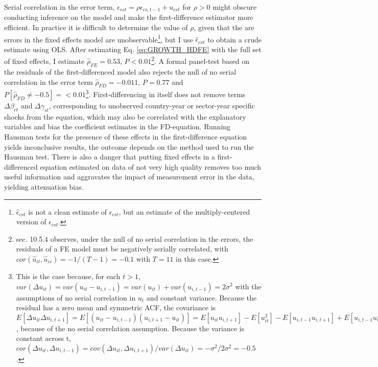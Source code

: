 \documentclass[a4paper]{article}
\begin{document}
Serial correlation in the error term, $\epsilon_{cst} = \rho \epsilon_{cs,t-1} + u_{cst}$ for $\rho > 0$ might obscure conducting inference on the model and make the first-difference estimator more efficient. In practice it is difficult to determine the value of $\rho$, given that the are errors in the fixed effects model are unobservable\footnote{$\hat{\epsilon}_{cst}$ is not a clean estimate of $\epsilon_{cst}$, but an estimate of the multiply-centered version of $\epsilon_{cst}$.}, but I use $\hat{\epsilon}_{cst}$ to obtain a crude estimate using OLS. After estimating Eq. \ref{eq:GROWTH_HDFE} with the full set of fixed effects, I estimate $\hat{\rho}_{FE} = 0.53$, $P<0.01$\footnote{\citet{wooldridge2010econometric} sec. 10.5.4 observes, under the null of no serial correlation in the errors, the residuals of a FE model must be negatively serially correlated, with $cor(\hat{u}_{it}, \hat{u}_{is})=-1/(T-1) = -0.1$ with $T = 11$ in this case.}. A formal panel-test based on the residuals of the first-differenced model also rejects the null of no serial correlation in the error term $\hat{\rho}_{FD} = -0.011$, $P=0.77$ and $P[\hat{\rho}_{FD} \neq -0.5]=<0.01$\footnote{This is the case because, for each $t > 1$, $var(\Delta u_{it}) = var(u_{it} - u_{i,t-1}) = var(u_{it}) + var(u_{i,t-1}) = 2\sigma^2$ with the assumptions of no serial correlation in $u_t$ and constant variance. Because the residual has a zero mean and symmetric ACF, the covariance is $E[\Delta u_{it}\Delta u_{i,t+1}] = E[(u_{it} - u_{i,t-1})(u_{i,t+1} - u_{it})] = E[u_{it} u_{i,t+1}] - E[u_{it}^2] - E[u_{i,t-1} u_{i,t+1}] + E[u_{i,t-1} u_{it}] = -E[u_{it}^2] = -\sigma^2$, because of the no serial correlation assumption. Because the variance is constant across t, $cor(\Delta u_{it},  \Delta u_{i,t-1}) = cov(\Delta u_{it},  \Delta u_{i,t+1})/var(\Delta u_{it}) = -\sigma^2/2\sigma^2 = -0.5$.}. First-differencing in itself does not remove terms $\Delta\beta_{ct}$ and $\Delta\gamma_{st}$, corresponding to unobserved country-year or sector-year specific shocks from the equation, which may also be correlated with the explanatory variables and bias the coefficient estimates in the FD-equation. Running Hausman tests for the presence of these effects in the first-difference equation yields inconclusive results, the outcome depends on the method used to run the Hausman test. There is also a danger that putting fixed effects in a first-differenced equation estimated on data of not very high quality removes too much useful information and aggravates the impact of measurement error in the data, yielding attenuation bias.   \newline
\end{document}
